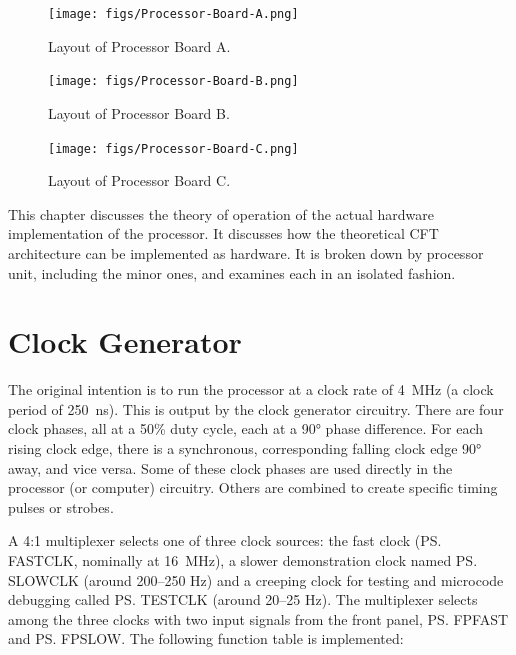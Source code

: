\begin{figure}
\texttt{[image: figs/Processor-Board-A.png]}\vspace{2em}\\
\caption[Layout of Processor Board A]{\label{fig:layout-board-a} Layout of Processor Board A.}
\end{figure}
\begin{figure}
\texttt{[image: figs/Processor-Board-B.png]}\vspace{2em}\\
\caption[Layout of Processor Board B]{\label{fig:layout-board-b} Layout of Processor Board B.}
\end{figure}
\begin{figure}
\texttt{[image: figs/Processor-Board-C.png]}\vspace{2em}\\
\caption[Layout of Processor Board C]{\label{fig:layout-board-c} Layout of Processor Board C.}
\end{figure}

This chapter discusses the theory of operation of the actual hardware
implementation of the processor. It discusses how the theoretical CFT
architecture can be implemented as hardware. It is broken down by
processor unit, including the minor ones, and examines each in an
isolated fashion.

\section{Clock Generator}

The original intention is to run the processor at a clock rate of 4~MHz (a
clock period of 250~ns). This is output by the clock generator circuitry. There
are four clock phases, all at a 50\% duty cycle, each at a 90° phase
difference. For each rising clock edge, there is a synchronous, corresponding
falling clock edge 90° away, and vice versa. Some of these clock phases are
used directly in the processor (or computer) circuitry. Others are combined to
create specific timing pulses or strobes.

A 4:1 multiplexer selects one of three clock sources: the fast clock
(\ps{FASTCLK}, nominally at 16~MHz), a slower demonstration clock named
\ps{SLOWCLK} (around 200–250 Hz) and a creeping clock for testing and microcode
debugging called \ps{TESTCLK} (around 20–25 Hz). The multiplexer selects among
the three clocks with two input signals from the front panel, \ps{FPFAST} and
\ps{FPSLOW}. The following function table is implemented:

